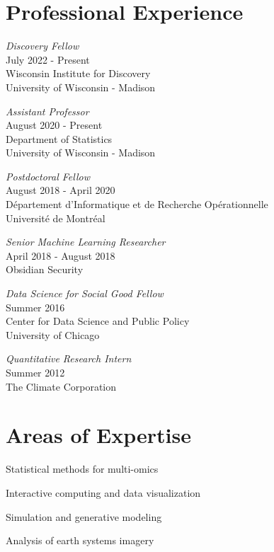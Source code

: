 \documentclass[letterpaper]{article}
\renewenvironment{itemize}{
  \begin{list}{}{
    \setlength{\leftmargin}{1.5em}
  }
}{
  \end{list}
}
\begin{document}
\section*{Professional Experience}
\begin{itemize}
\item \textit{Discovery Fellow} \\
July 2022 - Present \\
Wisconsin Institute for Discovery \\
University of Wisconsin - Madison

\item \textit{Assistant Professor}\\
August 2020 - Present \\
Department of Statistics \\
University of Wisconsin - Madison

\item \textit{Postdoctoral Fellow}\\
August 2018 - April 2020 \\
D\'epartement d'Informatique et de Recherche Op\'erationnelle \\
Universit\'e de Montr\'eal

\item \textit{Senior Machine Learning Researcher} \\
  April 2018 - August 2018 \\
  Obsidian Security
\item \textit{Data Science for Social Good Fellow} \\
  Summer 2016 \\
  Center for Data Science and Public Policy\\
  University of Chicago
\item \textit{Quantitative Research Intern} \\
  Summer 2012 \\
  The Climate Corporation
\end{itemize}

\section*{Areas of Expertise}
\begin{itemize}
  \item Statistical methods for multi-omics
  \item Interactive computing and data visualization
  \item Simulation and generative modeling
  \item Analysis of earth systems imagery
\end{itemize}
\end{document}

